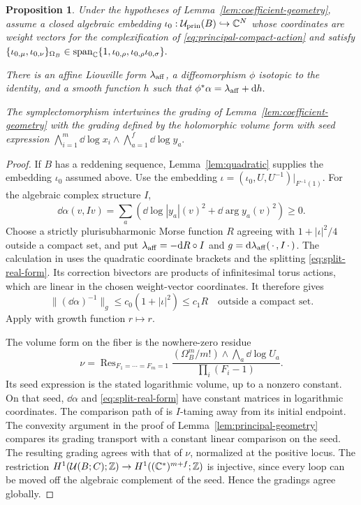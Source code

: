 \documentclass[12pt, letter]{amsart}
\newtheorem{proposition}[theorem]{Proposition}
\theoremstyle{definition}
\newcommand{\Z}{\mathbb Z}
\newcommand{\pr}{\mathrm{prin}}
\numberwithin{equation}{section}
\begin{document}
\begin{proposition}\label{prop:coefficient-affine}
Under the hypotheses of Lemma~\ref{lem:coefficient-geometry},
assume a closed algebraic embedding
$\iota_0:\cU_{\pr}(B)\hookrightarrow\C^N$ whose coordinates
are weight vectors for the complexification of
\eqref{eq:principal-compact-action} and satisfy
$
 \{\iota_{0,\mu},\iota_{0,\nu}\}_{\Omega_B}
 \in\operatorname{span}_{\mathbb C}
       \{1,\iota_{0,\rho},\iota_{0,\rho}\iota_{0,\sigma}\}.$

There is an affine Liouville form $\lambda_{\mathrm{aff}}$, a diffeomorphism
$\phi$ isotopic to the identity, and a smooth function $h$ such that
$
 \phi^*\alpha=\lambda_{\mathrm{aff}}+\mathrm{d} h.
$

The symplectomorphism intertwines the grading of
Lemma~\ref{lem:coefficient-geometry} with the grading defined
by the holomorphic volume form with seed expression
$
 \bigwedge_{i=1}^m\dd\log x_i\wedge
 \bigwedge_{a=1}^f\dd\log y_a.
$ 
\end{proposition}
\begin{proof}
If $B$ has a reddening sequence, Lemma~\ref{lem:quadratic}
supplies the embedding $\iota_0$ assumed above.
Use the embedding $\iota=(\iota_0,U,U^{-1})|_{F^{-1}(1)}$.
For the algebraic complex structure $I$,
\[
 \dd\alpha(v,Iv)
 =\sum_a\left(\dd\log|y_a|(v)^2+\dd\arg y_a(v)^2\right)\ge0.
\]
Choose a strictly plurisubharmonic Morse function $R$ agreeing
with $1+|\iota|^2/4$ outside a compact set, and put
$\lambda_{\mathrm{aff}}=-\mathrm{d} R\circ I$ and $g=\mathrm{d}\lambda_{\mathrm{aff}}(\,\cdot\,,I\,\cdot\,)$.
The calculation in \cite[proof of Proposition~B.6]{HS} uses
the quadratic coordinate brackets and the splitting
\eqref{eq:split-real-form}. Its correction bivectors are products
of infinitesimal torus actions, which are linear in the chosen
weight-vector coordinates. It therefore gives
\[
 \| (\dd\alpha)^{-1}\|_g\le c_0(1+|\iota|^2)\le c_1R
 \quad\text{outside a compact set}.
\]
Apply \cite[Theorem~1.4]{HSinv} with growth function $r\mapsto r$.

The volume form on the fiber is the nowhere-zero residue
\[
 \nu=\operatorname{Res}_{F_1=\cdots=F_m=1}
 \frac{(\Omega_B^m/m!)\wedge\bigwedge_a\dd\log U_a}
      {\prod_i(F_i-1)}.
\]
Its seed expression is the stated logarithmic volume, up to a
nonzero constant. On that seed, $\dd\alpha$ and
\eqref{eq:split-real-form} have constant matrices in logarithmic
coordinates. The comparison path of \cite[Section~4]{HSinv}
is $I$-taming away from its initial endpoint.
The convexity argument in the proof of
Lemma~\ref{lem:principal-geometry} compares its grading transport
with a constant linear comparison on the seed.
The resulting grading agrees with that of $\nu$, normalized at
the positive locus. The restriction
$H^1(\cU(B;C);\Z)\to H^1((\C^*)^{m+f};\Z)$ is injective,
since every loop can be moved off the algebraic complement of
the seed. Hence the gradings agree globally.
\end{proof}
\end{document}
